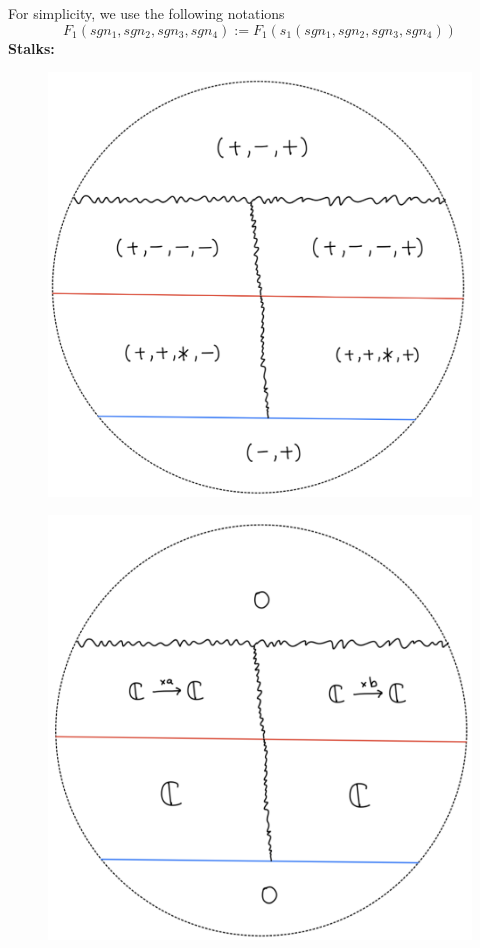 For simplicity, we use the following notations
\[
F_1(sgn_1,sgn_2,sgn_3,sgn_4):= F_1(s_1(sgn_1,sgn_2,sgn_3,sgn_4))
\]
\textbf{Stalks:}
\begin{figure}[H]
    \centering
    \includegraphics[scale = 0.95]{diagrams/lemma2/45.png} 
    \caption{}
    \label{fig:your-label}
\end{figure}
\begin{figure}[H]
    \centering
    \includegraphics[scale = 0.95]{diagrams/lemma2/46.png} 
    \caption{}
    \label{fig:your-label}
\end{figure}
